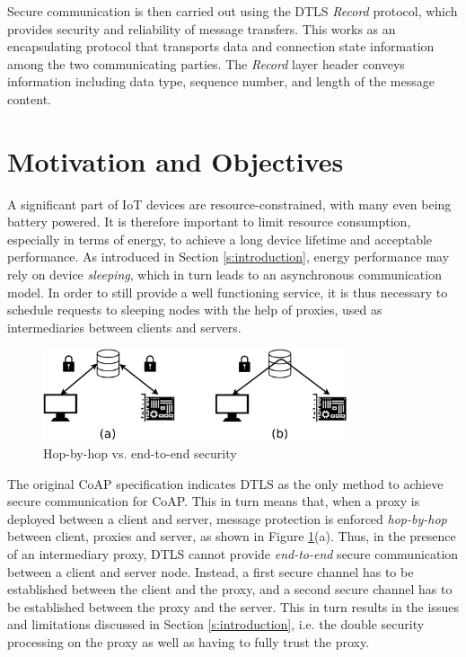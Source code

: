 {Secure communication is then carried out using the DTLS \textit{Record} protocol, which provides security and reliability of message transfers. This works as an encapsulating protocol that transports data and connection state information among the two communicating parties. The \textit{Record} layer header conveys information including data type, sequence number, and length of the message content.

\section{Motivation and Objectives}
\label{sec:obj}

A significant part of IoT devices are resource-constrained, with many even being battery powered. It is therefore important to limit resource consumption, especially in terms of energy, to achieve a long device lifetime and acceptable performance. As introduced in Section \ref{s:introduction}, energy performance may rely on device \emph{sleeping}, which in turn leads to an asynchronous communication model. In order to still provide a well functioning service, it is thus necessary to schedule requests to sleeping nodes with the help of proxies, used as intermediaries between clients and servers.

\begin{figure}[!ht]
\centering
\includegraphics[width=0.8\textwidth]{papers/oscore/images/secure_comm}
\caption{Hop-by-hop vs. end-to-end security}
\label{fig:secure_comm}
\end{figure}

The original CoAP specification \cite{rfc7252} indicates DTLS \cite{rfc6347} as the only method to achieve secure communication for CoAP. This in turn means that, when a proxy is deployed between a client and server, message protection is enforced \emph{hop-by-hop} between client, proxies and server, as shown in Figure \ref{fig:secure_comm}(a). Thus, in the presence of an intermediary proxy, DTLS cannot provide \emph{end-to-end} secure communication between a client and server node. Instead, a first secure channel has to be established between the client and the proxy, and a second secure channel has to be established between the proxy and the server. This in turn results in the issues and limitations discussed in Section \ref{s:introduction}, i.e. the double security processing on the proxy as well as having to fully trust the proxy.

}
